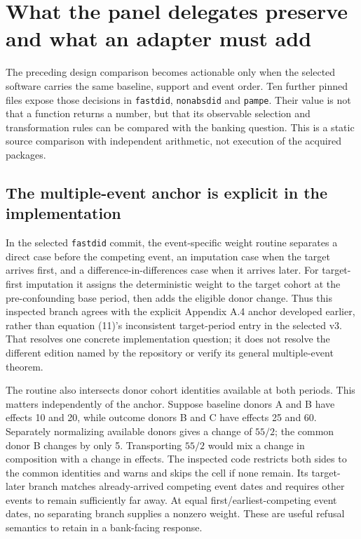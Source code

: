 \section{What the panel delegates preserve and what an adapter must add}
\label{sec:exec28-panel-delegates}

The preceding design comparison becomes actionable only when the selected software carries the same baseline, support
and event order. Ten further pinned files expose those decisions in \texttt{fastdid}, \texttt{nonabsdid} and \texttt{pampe}.
Their value is not that a function returns a number, but that its observable selection and transformation rules can be
compared with the banking question. This is a static source comparison with independent arithmetic, not execution of the
acquired packages.\citep{exec28_panel_delegates}

\subsection{The multiple-event anchor is explicit in the implementation}

In the selected \texttt{fastdid} commit, the event-specific weight routine separates a direct case before the competing
event, an imputation case when the target arrives first, and a difference-in-differences case when it arrives later.
For target-first imputation it assigns the deterministic weight to the target cohort at the pre-confounding base period,
then adds the eligible donor change. Thus this inspected branch agrees with the explicit Appendix A.4 anchor developed
earlier, rather than equation (11)'s inconsistent target-period entry in the selected v3. That resolves one concrete
implementation question; it does not resolve the different edition named by the repository or verify its general
multiple-event theorem.\citep{exec28_panel_delegates}

The routine also intersects donor cohort identities available at both periods. This matters independently of the anchor.
Suppose baseline donors A and B have effects 10 and 20, while outcome donors B and C have effects 25 and 60. Separately
normalizing available donors gives a change of $55/2$; the common donor B changes by only 5. Transporting $55/2$ would
mix a change in composition with a change in effects. The inspected code restricts both sides to the common identities
and warns and skips the cell if none remain. Its target-later branch matches already-arrived competing event dates and
requires other events to remain sufficiently far away. At equal first/earliest-competing event dates, no separating branch
supplies a nonzero weight. These are useful refusal semantics to retain in a bank-facing response.\citep{exec28_panel_delegates,exec28_panel_delegate_reference}


